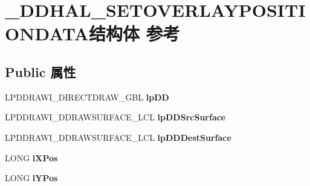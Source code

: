 \hypertarget{struct___d_d_h_a_l___s_e_t_o_v_e_r_l_a_y_p_o_s_i_t_i_o_n_d_a_t_a}{}\section{\+\_\+\+D\+D\+H\+A\+L\+\_\+\+S\+E\+T\+O\+V\+E\+R\+L\+A\+Y\+P\+O\+S\+I\+T\+I\+O\+N\+D\+A\+T\+A结构体 参考}
\label{struct___d_d_h_a_l___s_e_t_o_v_e_r_l_a_y_p_o_s_i_t_i_o_n_d_a_t_a}
\subsection*{Public 属性}
\begin{DoxyCompactItemize}
\item 
\mbox{\label{struct___d_d_h_a_l___s_e_t_o_v_e_r_l_a_y_p_o_s_i_t_i_o_n_d_a_t_a_a9f71eb3bedcde67816d3b47cb862ea29}} 
L\+P\+D\+D\+R\+A\+W\+I\+\_\+\+D\+I\+R\+E\+C\+T\+D\+R\+A\+W\+\_\+\+G\+BL {\bfseries lp\+DD}
\item 
\mbox{\label{struct___d_d_h_a_l___s_e_t_o_v_e_r_l_a_y_p_o_s_i_t_i_o_n_d_a_t_a_a116ebf83064eeda206b8aefde4724412}} 
L\+P\+D\+D\+R\+A\+W\+I\+\_\+\+D\+D\+R\+A\+W\+S\+U\+R\+F\+A\+C\+E\+\_\+\+L\+CL {\bfseries lp\+D\+D\+Src\+Surface}
\item 
\mbox{\label{struct___d_d_h_a_l___s_e_t_o_v_e_r_l_a_y_p_o_s_i_t_i_o_n_d_a_t_a_a54a0532ee140882e25950f9135f09ea5}} 
L\+P\+D\+D\+R\+A\+W\+I\+\_\+\+D\+D\+R\+A\+W\+S\+U\+R\+F\+A\+C\+E\+\_\+\+L\+CL {\bfseries lp\+D\+D\+Dest\+Surface}
\item 
\mbox{\label{struct___d_d_h_a_l___s_e_t_o_v_e_r_l_a_y_p_o_s_i_t_i_o_n_d_a_t_a_ac878daacc08a83a0a7199e02eb1aa61f}} 
L\+O\+NG {\bfseries l\+X\+Pos}
\item 
\mbox{\label{struct___d_d_h_a_l___s_e_t_o_v_e_r_l_a_y_p_o_s_i_t_i_o_n_d_a_t_a_ad9b5c27ec33abb5ed07519ec5295c206}} 
L\+O\+NG {\bfseries l\+Y\+Pos}

\end{DoxyCompactItemize}

